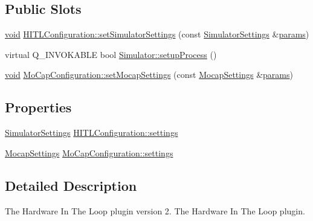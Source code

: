 \subsection*{Public Slots}
\begin{DoxyCompactItemize}
\item 
\hyperlink{group___u_a_v_objects_plugin_ga444cf2ff3f0ecbe028adce838d373f5c}{void} \hyperlink{group___h_i_t_l_plugin_gacd597e5682d8dbe29504ed7c45245695}{H\-I\-T\-L\-Configuration\-::set\-Simulator\-Settings} (const \hyperlink{group___h_i_t_l_plugin_ga052199f1328d3002bce3e45345aa7f4e}{Simulator\-Settings} \&\hyperlink{glext_8h_afeb6390ab3bc8a0e96a88aff34d52288}{params})
\item 
virtual Q\-\_\-\-I\-N\-V\-O\-K\-A\-B\-L\-E bool \hyperlink{group___h_i_t_l_plugin_ga25516220ab21d874ae00dd9a21c3e313}{Simulator\-::setup\-Process} ()
\item 
\hyperlink{group___u_a_v_objects_plugin_ga444cf2ff3f0ecbe028adce838d373f5c}{void} \hyperlink{group___h_i_t_l_plugin_ga1c9c0bbef4c538125abfd27b6fc47208}{Mo\-Cap\-Configuration\-::set\-Mocap\-Settings} (const \hyperlink{group___mo_cap_plugin_ga6083347a5b3eb70e360f599354dc0f0b}{Mocap\-Settings} \&\hyperlink{glext_8h_afeb6390ab3bc8a0e96a88aff34d52288}{params})
\end{DoxyCompactItemize}
\subsection*{Properties}
\begin{DoxyCompactItemize}
\item 
\hyperlink{group___h_i_t_l_plugin_ga052199f1328d3002bce3e45345aa7f4e}{Simulator\-Settings} \hyperlink{group___h_i_t_l_plugin_ga961f33f3db5f79daaf792a4999ac5c06}{H\-I\-T\-L\-Configuration\-::settings}
\item 
\hyperlink{group___mo_cap_plugin_ga6083347a5b3eb70e360f599354dc0f0b}{Mocap\-Settings} \hyperlink{group___h_i_t_l_plugin_ga7211120cc5d6c7feffb594a36552a9af}{Mo\-Cap\-Configuration\-::settings}
\end{DoxyCompactItemize}


\subsection{Detailed Description}
The Hardware In The Loop plugin version 2. The Hardware In The Loop plugin.

